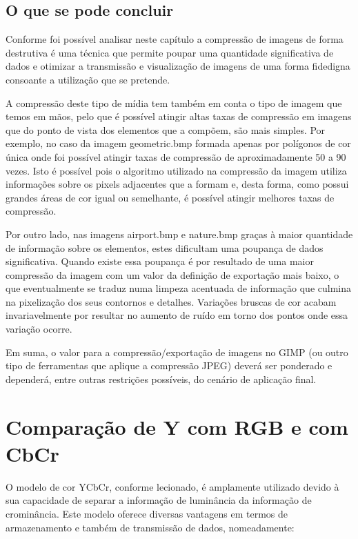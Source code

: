 \documentclass{article}
\begin{document}
\subsection{O que se pode concluir}

Conforme foi possível analisar neste capítulo a compressão de imagens de forma destrutiva é uma técnica que permite poupar uma quantidade significativa de dados e otimizar a transmissão e visualização de imagens de uma forma fidedigna consoante a utilização que se pretende.

A compressão deste tipo de mídia tem também em conta o tipo de imagem que temos em mãos, pelo que é possível atingir altas taxas de compressão em imagens que do ponto de vista dos elementos que a compõem, são mais simples. Por exemplo, no caso da imagem geometric.bmp formada apenas por polígonos de cor única onde foi possível atingir taxas de compressão de aproximadamente 50 a 90 vezes. Isto é possível pois o algoritmo utilizado na compressão da imagem utiliza informações sobre os pixels adjacentes que a formam e, desta forma, como possui grandes áreas de cor igual ou semelhante, é possível atingir melhores taxas de compressão.

Por outro lado, nas imagens airport.bmp e nature.bmp graças à maior quantidade de informação sobre os elementos, estes dificultam uma poupança de dados significativa. Quando existe essa poupança é por resultado de uma maior compressão da imagem com um valor da definição de exportação mais baixo, o que eventualmente se traduz numa limpeza acentuada de informação que culmina na pixelização dos seus contornos e detalhes. Variações bruscas de cor acabam invariavelmente por resultar no aumento de ruído em torno dos pontos onde essa variação ocorre.

Em suma, o valor para a compressão/exportação de imagens no GIMP (ou outro tipo de ferramentas que aplique a compressão JPEG) deverá ser ponderado e dependerá, entre outras restrições possíveis, do cenário de aplicação final.
\newpage

\section{Comparação de Y com RGB e com CbCr}

O modelo de cor YCbCr, conforme lecionado, é amplamente utilizado devido à sua capacidade de separar a informação de luminância da informação de crominância. Este modelo oferece diversas vantagens em termos de armazenamento e também de transmissão de dados, nomeadamente:
\end{document}
